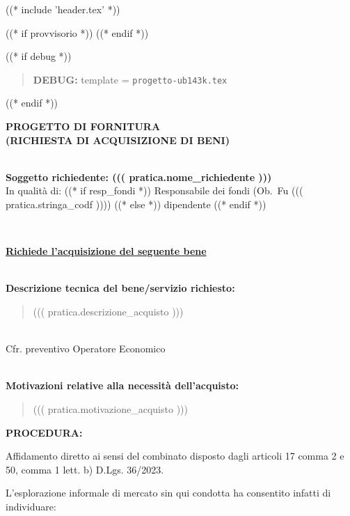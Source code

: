 
((* include 'header.tex' *))

((* if provvisorio *))
((* endif *))


\topaddr

((* if debug *))
\begin{quotation}
	\textbf{DEBUG:} template = \texttt{progetto-ub143k.tex}
\end{quotation}
((* endif *))

\begin{center}
\textbf{PROGETTO DI FORNITURA \\ (RICHIESTA DI ACQUISIZIONE DI BENI)}
\end{center}

~\\
\textbf{Soggetto richiedente: ((( pratica.nome_richiedente )))} \\

In qualità di:          %
((* if resp_fondi *)) Responsabile dei fondi (Ob.~Fu ((( pratica.stringa_codf ))))
((* else *)) dipendente
((* endif *))

~\\
\begin{center}
\textbf{\underline{Richiede l'acquisizione del seguente bene}}
\end{center}

~\\
\textbf{Descrizione tecnica del bene/servizio richiesto:}
\begin{quote}
((( pratica.descrizione_acquisto )))
\end{quote}

~\\
Cfr. preventivo Operatore Economico 

~\\
\textbf{Motivazioni relative alla necessità dell’acquisto: }
\begin{quote}
((( pratica.motivazione_acquisto )))
\end{quote}


\textbf{PROCEDURA: } %

Affidamento diretto ai sensi del combinato disposto dagli articoli 17 comma 2 e 50, comma 1 lett. b) D.Lgs. 36/2023.

L’esplorazione informale di mercato sin qui condotta ha consentito infatti di individuare:


